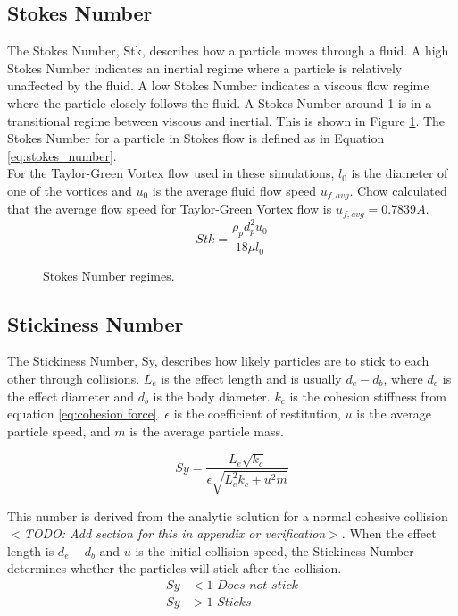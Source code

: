 \documentclass[10pt,a4paper,titlepage]{report}
\begin{document}
\subsection{Stokes Number}
The Stokes Number, Stk, describes how a particle moves through a fluid. A high Stokes Number indicates an inertial regime where a particle is relatively unaffected by the fluid. A low Stokes Number indicates a viscous flow regime where the particle closely follows the fluid. A Stokes Number around 1 is in a transitional regime between viscous and inertial. This is shown in Figure \ref{fig:stokes_number}. The Stokes Number for a particle in Stokes flow is defined as in Equation \ref{eq:stokes_number}\cite{achow}.
\\For the Taylor-Green Vortex flow used in these simulations, $l_0$ is the diameter of one of the vortices and $u_0$ is the average fluid flow speed $u_{f,avg}$. Chow\cite{achow} calculated that the average flow speed for Taylor-Green Vortex flow is $u_{f,avg} = 0.7839A$.
\begin{equation}
Stk = \dfrac{\rho_p d_p^2 u_0}{18 \mu l_0}
\label{eq:stokes_number}
\end{equation}
\begin{figure}[!htb]
\centering

\caption{Stokes Number regimes.}
\label{fig:stokes_number}
\end{figure}
\subsection{Stickiness Number}
The Stickiness Number, Sy, describes how likely particles are to stick to each other through collisions. $L_e$ is the effect length and is usually $d_e - d_b$, where $d_e$ is the effect diameter and $d_b$ is the body diameter. $k_c$ is the cohesion stiffness from equation \ref{eq:cohesion force}. $\epsilon$ is the coefficient of restitution, $u$ is the average particle speed, and $m$ is the average particle mass.

\begin{equation}
Sy = \dfrac{L_e \sqrt{k_c}}{\epsilon \sqrt{L_e^2 k_c + u^2 m}}
\end{equation}

This number is derived from the analytic solution for a normal cohesive collision $<$\textit{TODO: Add section for this in appendix or verification}$>$. When the effect length is $d_e - d_b$ and $u$ is the initial collision speed, the Stickiness Number determines whether the particles will stick after the collision.
\begin{align*}
Sy &< 1 \textit{ Does not stick}
\\ Sy & > 1 \textit{ Sticks}
\end{align*}
\end{document}
